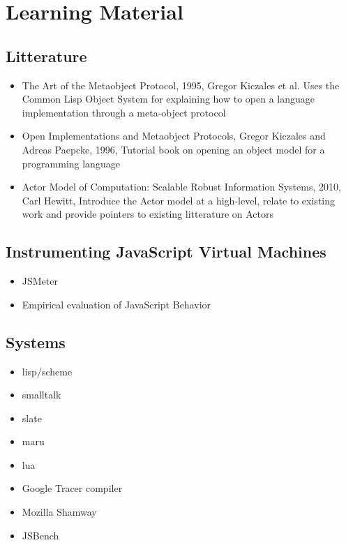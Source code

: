 \section{Learning Material}

\subsection{Litterature}
\begin{itemize}
    \item The Art of the Metaobject Protocol, 1995, Gregor Kiczales et al. Uses
        the Common Lisp Object System for explaining how to open a
        language implementation through a meta-object protocol
    \item Open Implementations and Metaobject Protocols, Gregor Kiczales and
        Adreas Paepcke, 1996, Tutorial book on opening an object model for a
        programming language
    \item Actor Model of Computation: Scalable Robust Information Systems,
        2010, Carl Hewitt, Introduce the Actor model at a high-level, relate to
        existing work and provide pointers to existing litterature on Actors
\end{itemize}

\subsection{Instrumenting JavaScript Virtual Machines}
\begin{itemize}
    \item JSMeter
    \item Empirical evaluation of JavaScript Behavior
\end{itemize}


\subsection{Systems}
\begin{itemize}
    \item lisp/scheme
    \item smalltalk
    \item slate
    \item maru
    \item lua
    \item Google Tracer compiler
    \item Mozilla Shamway
    \item JSBench
\end{itemize}
